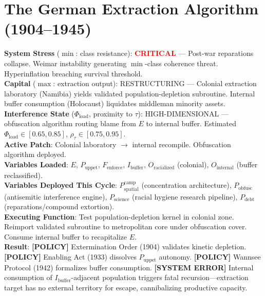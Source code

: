 \providecommand{\SourceNote}[1]{\footnote{#1}}

\chapter{The German Extraction Algorithm (1904--1945)}
\label{ch:german}

\begin{tcolorbox}[colback=black!5, colframe=black!70, fonttitle=\bfseries\ttfamily, title=RUNTIME LOG: 1904--1945 (SOUTHWEST AFRICA $\rightarrow$ CENTRAL EUROPE)]
\ttfamily\small
\textbf{System Stress} ($\min$: class resistance): \textcolor{red}{\textbf{CRITICAL}} --- Post-war reparations collapse. Weimar instability generating $\min$-class coherence threat. Hyperinflation breaching survival threshold.\\
\textbf{Capital} ($\max$: extraction output): RESTRUCTURING --- Colonial extraction laboratory (Namibia) yields validated population-depletion subroutine. Internal buffer consumption (Holocaust) liquidates middleman minority assets.\\
\textbf{Interference State} ($\Phi_{\text{load}}$, proximity to $\tau$): HIGH-DIMENSIONAL --- obfuscation algorithm routing blame from $E$ to internal buffer. Estimated $\Phi_{\text{load}} \in [0.65, 0.85]$, $\rho_{\tau} \in [0.75, 0.95]$.\\
\textbf{Active Patch}: Colonial laboratory $\rightarrow$ internal recompile. Obfuscation algorithm deployed.\\
\textbf{Variables Loaded}: $E$, $P_{\text{uppet}}$, $F_{\text{enforce}}$, $I_{\text{buffer}}$, $O_{\text{racialized}}$ (colonial), $O_{\text{internal}}$ (buffer reclassified).\\
\textbf{Variables Deployed This Cycle}: $P_{\text{spatial}}^{\text{camp}}$ (concentration architecture), $P_{\text{obfusc}}$ (antisemitic interference engine), $P_{\text{science}}$ (racial hygiene research pipeline), $P_{\text{debt}}$ (reparations/compound extortion).\\
\textbf{Executing Function}: Test population-depletion kernel in colonial zone. Reimport validated subroutine to metropolitan core under obfuscation cover. Consume internal buffer to recapitalize $E$.\\
\textbf{Result}: \textbf{[POLICY]} Extermination Order (1904) validates kinetic depletion. \textbf{[POLICY]} Enabling Act (1933) dissolves $P_{\text{uppet}}$ autonomy. \textbf{[POLICY]} Wannsee Protocol (1942) formalizes buffer consumption. \textbf{[SYSTEM ERROR]} Internal consumption of $I_{\text{buffer}}$-adjacent population triggers fatal recursion---extraction target has no external territory for escape, cannibalizing productive capacity.
\end{tcolorbox}

